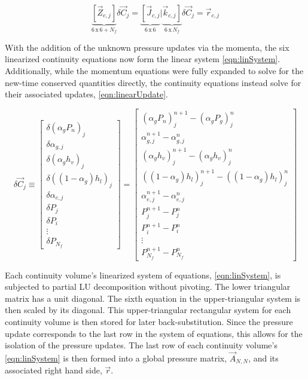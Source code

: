 \begin{equation}
\label{eqn:linSystem}
\underbrace{\left[\vec{Z}_{c, j}\right]}_{6\, \text{x}\, 6 + N_{f}} \delta \vec{C}_{j} = \underbrace{\left[\vec{J}_{c, j}\right.}_{6\, \text{x}\, 6}|{\underbrace{\left.\vec{k}_{c, j}\right]}_{6\, \text{x}\, N_{f}}}\delta \vec{C}_{j} = \vec{r}_{c,j}
\end{equation}

With the addition of the unknown pressure updates via the momenta, the six linearized continuity equations now form the linear system \eqref{eqn:linSystem}.
Additionally, while the momentum equations were fully expanded to solve for the new-time conserved quantities directly, the continuity equations instead solve for their associated updates, \eqref{eqn:linearUpdate}.

\begin{equation}
\label{eqn:linearUpdate}
\delta \vec{C}_{j} \equiv 
\begin{bmatrix}
\delta ( \alpha_{g} P_{n} )_j \\
\delta \alpha_{g, j} \\
\delta ( \alpha_{g} h_v )_j \\
\delta ( (1 - \alpha_{g} ) h_l )_j \\
\delta \alpha_{e,j} \\
\delta P_j \\ 
\delta P_i \\
\vdots \\
\delta P_{N_{f}}
\end{bmatrix}
=
\begin{bmatrix}
( \alpha_{g} P_{n})_{j}^{n+1} - (\alpha_{g} P_{g} )_{j}^{n} \\
\alpha^{n+1}_{g,j} - \alpha^{n}_{g,j} \\
( \alpha_{g} h_{v} )_{j}^{n+1} - ( \alpha_{g} h_{v} )_{j}^{n} \\
( ( 1 - \alpha_{g} ) h_{l} )_{j}^{n+1} - ( ( 1 - \alpha_{g} ) h_{l} )_{j}^{n} \\
\alpha^{n+1}_{e,j} - \alpha^{n}_{e,j} \\
 P_{j}^{n+1} - P_{j}^{n} \\
 P_{i}^{n+1} - P_{i}^{n} \\
 \vdots \\
 P_{N_{f}}^{n+1} - P_{N_{f}}^{n}
\end{bmatrix}
\end{equation}

Each continuity volume's linearized system of equations, \eqref{eqn:linSystem}, is subjected to partial LU decomposition without pivoting.
The lower triangular matrix has a unit diagonal.
The sixth equation in the upper-triangular system is then scaled by its diagonal.
This upper-triangular rectangular system for each continuity volume is then stored for later back-substitution.
Since the pressure update corresponds to the last row in the system of equations, this allows for the isolation of the pressure updates.
The last row of each continuity volume's \eqref{eqn:linSystem} is then formed into a global pressure matrix, $\vec{A}_{N,N}$, and its associated right hand side, $\vec{r}$.

